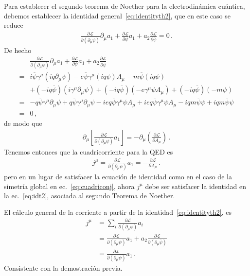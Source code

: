 \begin{frame}
Para establecer el segundo teorema de Noether para la electrodinámica cuántica, debemos establecer la identidad  general~\eqref{eq:identityth2}, que en este caso se reduce
\begin{align}
\frac{\partial\mathcal{L}}{\partial\left(\partial_{\mu} \psi\right)}
\partial_{\mu}a_{1}
+\frac{\partial \mathcal{L}}{\partial\psi}a_1
+a_2\frac{\partial \mathcal{L}}{\partial \overline{\psi}} =0\,.
\end{align}
De hecho
\begin{align}
&\frac{\partial\mathcal{L}}{\partial\left(\partial_{\mu} \psi\right)}
\partial_{\mu}a_{1}
+\frac{\partial \mathcal{L}}{\partial\psi}a_1
  +a_2\frac{\partial \mathcal{L}}{\partial \overline{\psi}}  \nonumber\\
=&i\overline{\psi}\gamma^{\mu}(iq\partial_{\mu} \psi)
-e\overline{\psi}\gamma^{\mu}(iq \psi)A_{\mu}
-m\overline{\psi}(iq \psi) \nonumber\\
&+\left( -iq\overline{\psi} \right)   \left( i \gamma^{\mu}\partial_{\mu}\psi \right)                                                      
+\left( -iq\overline{\psi} \right)\left( -e \gamma^{\mu}\psi A_{\mu} \right)
+\left( -iq\overline{\psi} \right)\left( -m\psi \right) \nonumber\\
    =&-q\overline{\psi}\gamma^{\mu}\partial_{\mu} \psi+ q\overline{\psi} \gamma^{\mu}\partial_{\mu}\psi
       -ieq\overline{\psi}\gamma^{\mu} \psi A_{\mu}+ieq \overline{\psi}  \gamma^{\mu}\psi A_{\mu}
       -iq m\overline{\psi}\psi +iqm\overline{\psi} \psi  \nonumber\\
=&0\,,
\end{align}
de modo que
\begin{align}
  \label{eq:idt2}
\partial_{\mu}\left[
\frac{\partial\mathcal{L}}{\partial\left(\partial_{\mu} \psi\right)}
a_{1}
\right]
  =-\partial_{\mu}\left(\frac{\partial \mathcal{L}}{\partial A_{\mu}}\right)\,.
\end{align}
Tenemos entonces que   la cuadricorriente para la QED es 
\begin{align}
  j^{\mu}=\frac{\partial \mathcal{L}}{\partial\left(\partial_{\mu} \psi \right)}a_1=-\frac{\partial \mathcal{L}}{\partial A_{\mu}}\,.
\end{align}
pero en un lugar de satisfacer la ecuación de identidad como en el caso de la simetría global en ec.~\eqref{eq:cuadriconj}, ahora  $j^{\mu}$ debe ser satisfacer la identidad en la ec.~\eqref{eq:idt2}, asociada al segundo Teorema de Noether.


El cálculo general de la corriente a partir de la identidad~\eqref{eq:identityth2}, es
\begin{align}
  j^\mu&=\sum_i\frac{\partial \mathcal{L}}{\partial\left(\partial_{\mu} \psi \right)}a_i \nonumber\\
  &=\frac{\partial\mathcal{L}}{\partial\left(\partial_\mu\psi\right)}a_1+a_2\frac{\partial\mathcal{L}}{\partial\left(\partial_\mu\bar{\psi}\right)} \nonumber\\
  &=\frac{\partial\mathcal{L}}{\partial\left(\partial_\mu\psi\right)}a_1\,.
\end{align}
Consistente con la demostración previa.


\end{frame}
